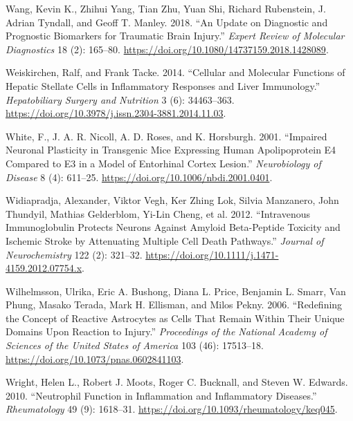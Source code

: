 \documentclass[9pt,lineno]{elife}
\newlength{\cslhangindent}
\newlength{\cslentryspacingunit} %
\newenvironment{CSLReferences}[2] %
 {%
  \setlength{\parindent}{0pt}
  \ifodd #1
  \let\oldpar\par
  \def\par{\hangindent=\cslhangindent\oldpar}
  \fi
  \setlength{\parskip}{#2\cslentryspacingunit}
 }%
 {}
\begin{document}
\begin{landscape}
\begin{landscape}
\begin{landscape}
\begin{landscape}
\begin{CSLReferences}{1}{0}
\leavevmode{}%
Wang, Kevin K., Zhihui Yang, Tian Zhu, Yuan Shi, Richard Rubenstein, J. Adrian Tyndall, and Geoff T. Manley. 2018. {``An Update on Diagnostic and Prognostic Biomarkers for Traumatic Brain Injury.''} \emph{Expert Review of Molecular Diagnostics} 18 (2): 165--80. \url{https://doi.org/10.1080/14737159.2018.1428089}.

\leavevmode{}%
Weiskirchen, Ralf, and Frank Tacke. 2014. {``Cellular and Molecular Functions of Hepatic Stellate Cells in Inflammatory Responses and Liver Immunology.''} \emph{Hepatobiliary Surgery and Nutrition} 3 (6): 34463--363. \url{https://doi.org/10.3978/j.issn.2304-3881.2014.11.03}.

\leavevmode{}%
White, F., J. A. R. Nicoll, A. D. Roses, and K. Horsburgh. 2001. {``Impaired {Neuronal Plasticity} in {Transgenic Mice Expressing Human Apolipoprotein E4 Compared} to {E3} in a {Model} of {Entorhinal Cortex Lesion}.''} \emph{Neurobiology of Disease} 8 (4): 611--25. \url{https://doi.org/10.1006/nbdi.2001.0401}.

\leavevmode{}%
Widiapradja, Alexander, Viktor Vegh, Ker Zhing Lok, Silvia Manzanero, John Thundyil, Mathias Gelderblom, Yi-Lin Cheng, et al. 2012. {``Intravenous Immunoglobulin Protects Neurons Against Amyloid Beta-Peptide Toxicity and Ischemic Stroke by Attenuating Multiple Cell Death Pathways.''} \emph{Journal of Neurochemistry} 122 (2): 321--32. \url{https://doi.org/10.1111/j.1471-4159.2012.07754.x}.

\leavevmode{}%
Wilhelmsson, Ulrika, Eric A. Bushong, Diana L. Price, Benjamin L. Smarr, Van Phung, Masako Terada, Mark H. Ellisman, and Milos Pekny. 2006. {``Redefining the Concept of Reactive Astrocytes as Cells That Remain Within Their Unique Domains Upon Reaction to Injury.''} \emph{Proceedings of the National Academy of Sciences of the United States of America} 103 (46): 17513--18. \url{https://doi.org/10.1073/pnas.0602841103}.

\leavevmode{}%
Wright, Helen L., Robert J. Moots, Roger C. Bucknall, and Steven W. Edwards. 2010. {``Neutrophil Function in Inflammation and Inflammatory Diseases.''} \emph{Rheumatology} 49 (9): 1618--31. \url{https://doi.org/10.1093/rheumatology/keq045}.


\end{CSLReferences}
\end{landscape}
\end{landscape}
\end{landscape}
\end{landscape}
\end{document}
